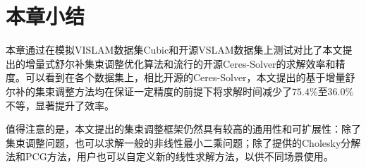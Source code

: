 \section{本章小结}

本章通过在模拟VISLAM数据集Cubic和开源VSLAM数据集上测试对比了本文提出的增量式舒尔补集束调整优化算法和流行的开源Ceres-Solver的求解效率和精度。可以看到在各个数据集上，相比开源的Ceres-Solver，本文提出的基于增量舒尔补的集束调整方法均在保证一定精度的前提下将求解时间减少了$75.4\%$至$36.0\%$不等，显著提升了效率。

值得注意的是，本文提出的集束调整框架仍然具有较高的通用性和可扩展性：除了集束调整问题，也可以求解一般的非线性最小二乘问题；除了提供的Cholesky分解法和PCG方法，用户也可以自定义新的线性求解方法，以供不同场景使用。
